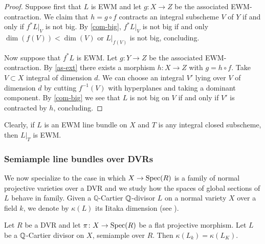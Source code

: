 \begin{proof}
	Suppose first that $L$ is EWM and let $g \colon X \to Z$ be the associated EWM-contraction. 	
	We claim that $h=g \circ f$ contracts an integral subscheme $V$ of $Y$ if and only if $f^{*}L|_{V}$ is not big. 	
	By \autoref{com-big}, $f^{*}L|_{V}$ is not big if and only $\dim (f(V))< \dim (V)$ or $L|_{f(V)}$ is not big, concluding. %
	
	Now suppose that $f^{*}L$ is EWM. Let $g \colon Y \to Z$ be the associated EWM-contraction. 
	By \autoref{as-ext} there exists a morphism $h \colon X \to Z$ with $g=h\circ f$. 
	Take $V\subset X$ integral of dimension $d$. We can choose an integral $V'$ lying over $V$ of dimension $d$ by cutting $f^{-1}(V)$ with hyperplanes and taking a dominant component. 
	By \autoref{com-big} we see that $L$ is not big on $V$ if and only if $V'$ is contracted by $h$, concluding.
\end{proof}

\begin{remark}
	Clearly, if $L$ is an EWM line bundle on $X$ and $T$ is any integral closed subscheme, then $L|_{T}$ is EWM.    
\end{remark}

	\subsubsection{Semiample line bundles over DVRs}
	We now specialize to the case in which $X\to\operatorname{Spec} (R)$ is a family of normal projective varieties over a DVR and we study how the spaces of global sections of $L$ behave in family. 	Given a $\mathbb{Q}$-Cartier $\mathbb{Q}$-divisor $L$ on a normal variety $X$ over a field $k$, we denote by $\kappa(L)$ its Iitaka dimension (see \cite[Definition 2.1.3]{La1}).
	
	\begin{lemma}\label{lemma_DIOK}
		Let $R$ be a DVR and let $\pi \colon X\to \operatorname{Spec} (R)$ be a flat projective morphism. 
		Let $L$ be a $\mathbb{Q}$-Cartier divisor on $X$, semiample over $R$. 
		Then $\kappa(L_k)=\kappa(L_K)$.
	\end{lemma}
	
